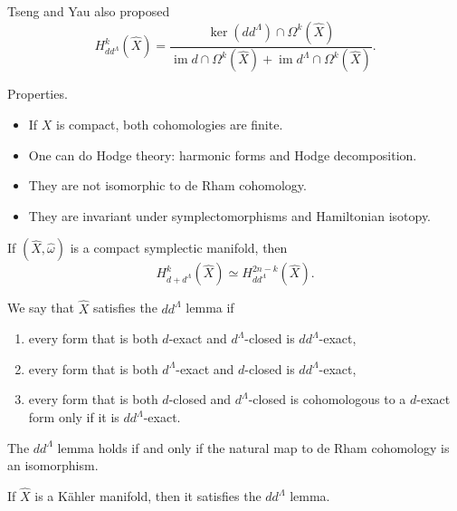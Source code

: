 \begin{definition}
\label{definition-tseng-yau-dd}
Tseng and Yau also proposed
$$
H^k_{dd^\Lambda}(\widehat X)
=\frac{
\ker(dd^\Lambda)\cap\Omega^k(\widehat X)
}{
\operatorname{im}d\cap\Omega^k(\widehat X)
+\operatorname{im}d^\Lambda\cap
\Omega^k(\widehat X)
}.
$$
\end{definition}

\medskip\noindent
Properties.
\begin{itemize}
\item If $X$ is compact, both
cohomologies are finite.
\item One can do Hodge theory:
harmonic forms and Hodge
decomposition.
\item They are not isomorphic to
de Rham cohomology.
\item They are invariant under
symplectomorphisms and Hamiltonian
isotopy.
\end{itemize}

\begin{theorem}
\label{theorem-tseng-yau}
If $(\widehat X,\widehat\omega)$ is a
compact symplectic manifold, then
$$
H^k_{d+d^\Lambda}(\widehat X)
\simeq
H^{2n-k}_{dd^\Lambda}(\widehat X).
$$
\end{theorem}

\begin{definition}
\label{definition-ddlambda-lemma}
We say that $\widehat X$ satisfies
the $dd^\Lambda$ lemma if
\begin{enumerate}
\item every form that is both
$d$-exact and $d^\Lambda$-closed is
$dd^\Lambda$-exact,
\item every form that is both
$d^\Lambda$-exact and $d$-closed is
$dd^\Lambda$-exact,
\item every form that is both
$d$-closed and $d^\Lambda$-closed is
cohomologous to a $d$-exact form
only if it is $dd^\Lambda$-exact.
\end{enumerate}
\end{definition}

\begin{theorem}
\label{theorem-ddlambda-dR}
The $dd^\Lambda$ lemma holds if and
only if the natural map to de Rham
cohomology is an isomorphism.
\end{theorem}

\begin{remark}
\label{remark-kaehler-ddlambda}
If $\widehat X$ is a K\"ahler
manifold, then it satisfies the
$dd^\Lambda$ lemma.
\end{remark}

